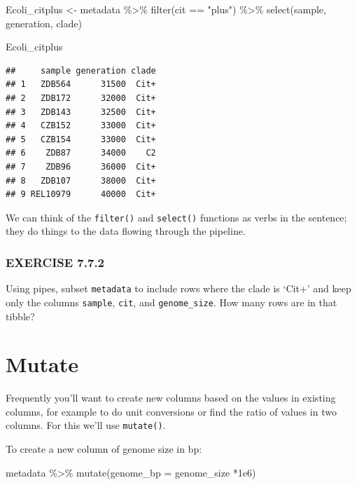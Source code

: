 \documentclass[
]{book}
\newenvironment{Shaded}{\begin{snugshade}}{\end{snugshade}}
\newcommand{\AttributeTok}[1]{\textcolor[rgb]{0.77,0.63,0.00}{#1}}
\newcommand{\FloatTok}[1]{\textcolor[rgb]{0.00,0.00,0.81}{#1}}
\newcommand{\FunctionTok}[1]{\textcolor[rgb]{0.00,0.00,0.00}{#1}}
\newcommand{\NormalTok}[1]{#1}
\newcommand{\OtherTok}[1]{\textcolor[rgb]{0.56,0.35,0.01}{#1}}
\newcommand{\SpecialCharTok}[1]{\textcolor[rgb]{0.00,0.00,0.00}{#1}}
\newcommand{\StringTok}[1]{\textcolor[rgb]{0.31,0.60,0.02}{#1}}
\begin{document}
\begin{Shaded}
\begin{Highlighting}[]
\NormalTok{Ecoli\_citplus }\OtherTok{\textless{}{-}}\NormalTok{ metadata }\SpecialCharTok{\%\textgreater{}\%}
  \FunctionTok{filter}\NormalTok{(cit }\SpecialCharTok{==} \StringTok{"plus"}\NormalTok{) }\SpecialCharTok{\%\textgreater{}\%}
  \FunctionTok{select}\NormalTok{(sample, generation, clade)}

\NormalTok{Ecoli\_citplus}
\end{Highlighting}
\end{Shaded}

\begin{verbatim}
##     sample generation clade
## 1   ZDB564      31500  Cit+
## 2   ZDB172      32000  Cit+
## 3   ZDB143      32500  Cit+
## 4   CZB152      33000  Cit+
## 5   CZB154      33000  Cit+
## 6    ZDB87      34000    C2
## 7    ZDB96      36000  Cit+
## 8   ZDB107      38000  Cit+
## 9 REL10979      40000  Cit+
\end{verbatim}

We can think of the \texttt{filter()} and \texttt{select()} functions as verbs in the sentence; they do things to the data flowing through the pipeline.

\hypertarget{exercise-7.7.2}{%
\subsubsection*{EXERCISE 7.7.2}\label{exercise-7.7.2}}

Using pipes, subset \texttt{metadata} to include rows where the clade is `Cit+' and keep only the columns \texttt{sample}, \texttt{cit}, and \texttt{genome\_size}.
How many rows are in that tibble?

\hypertarget{mutate}{%
\section{Mutate}\label{mutate}}

Frequently you'll want to create new columns based on the values in existing columns, for example to do unit conversions or find the ratio of values in two columns. For this we'll use \texttt{mutate()}.

To create a new column of genome size in bp:

\begin{Shaded}
\begin{Highlighting}[]
\NormalTok{metadata }\SpecialCharTok{\%\textgreater{}\%}
  \FunctionTok{mutate}\NormalTok{(}\AttributeTok{genome\_bp =}\NormalTok{ genome\_size }\SpecialCharTok{*}\FloatTok{1e6}\NormalTok{)}
\end{Highlighting}
\end{Shaded}
\end{document}
